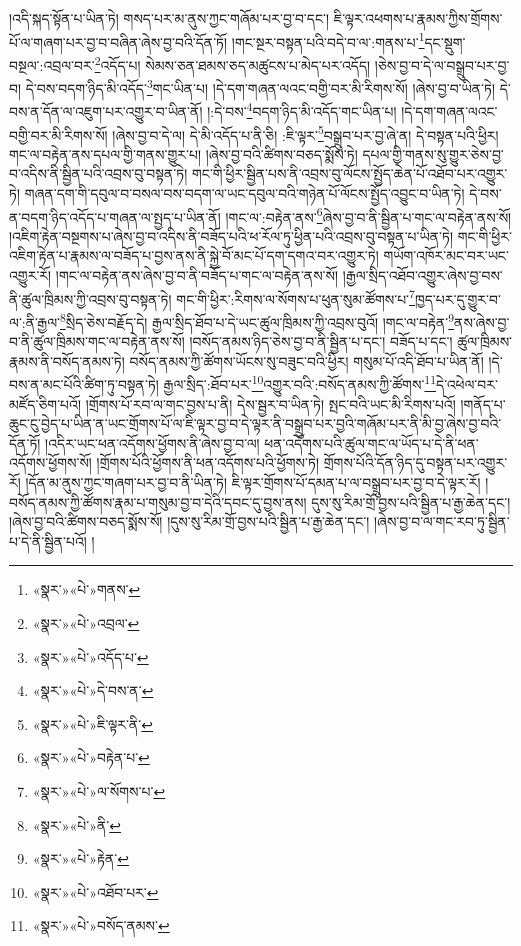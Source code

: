 །འདི་སྐད་སྟོན་པ་ཡིན་ཏེ། གསད་པར་མ་ནུས་ཀྱང་གཞོམ་པར་བྱ་བ་དང་། ཇི་ལྟར་འཕགས་པ་རྣམས་ཀྱིས་གྲོགས་པོ་ལ་གཞག་པར་བྱ་བ་བཞིན་ཞེས་བྱ་བའི་དོན་ཏོ། །གང་སྔར་བསྟན་པའི་བདེ་བ་ལ་:གནས་པ་\footnote{«སྣར་»«པེ་»གནས་}དང་སྡུག་བསྔལ་:འབྲལ་བར་\footnote{«སྣར་»«པེ་»འབྲལ་}འདོད་པ། སེམས་ཅན་ཐམས་ཅད་མཚུངས་པ་མེད་པར་འདོད། །ཅེས་བྱ་བ་དེ་ལ་བསྒྲུབ་པར་བྱ་བ། དེ་བས་བདག་ཉིད་མི་འདོད་\footnote{«སྣར་»«པེ་»འདོད་པ་}གང་ཡིན་པ། །དེ་དག་གཞན་ལའང་བགྱི་བར་མི་རིགས་སོ། །ཞེས་བྱ་བ་ཡིན་ཏེ། དེ་བས་ན་དོན་ལ་འཇུག་པར་འགྱུར་བ་ཡིན་ནོ། །:དེ་བས་\footnote{«སྣར་»«པེ་»དེ་བས་ན་}བདག་ཉིད་མི་འདོད་གང་ཡིན་པ། །དེ་དག་གཞན་ལའང་བགྱི་བར་མི་རིགས་སོ། །ཞེས་བྱ་བ་དེ་ལ། དེ་མི་འདོད་པ་ནི་ཅི། :ཇི་ལྟར་\footnote{«སྣར་»«པེ་»ཇི་ལྟར་ནི་}བསྒྲུབ་པར་བྱ་ཞེ་ན། དེ་བསྟན་པའི་ཕྱིར། གང་ལ་བརྟེན་ནས་དཔལ་གྱི་གནས་གྱུར་པ། །ཞེས་བྱ་བའི་ཚིགས་བཅད་སྨོས་ཏེ། དཔལ་གྱི་གནས་སུ་གྱུར་ཅེས་བྱ་བ་འདིས་ནི་སྦྱིན་པའི་འབྲས་བུ་བསྟན་ཏེ། གང་གི་ཕྱིར་སྦྱིན་པས་ནི་འབྲས་བུ་ལོངས་སྤྱོད་ཆེན་པོ་འཐོབ་པར་འགྱུར་ཏེ། གཞན་དག་གི་དབུལ་བ་བསལ་བས་བདག་ལ་ཡང་དབུལ་བའི་གཉེན་པོ་ལོངས་སྤྱོད་འབྱུང་བ་ཡིན་ཏེ། དེ་བས་ན་བདག་ཉིད་འདོད་པ་གཞན་ལ་སྤྱད་པ་ཡིན་ནོ། །གང་ལ་:བརྟེན་ནས་\footnote{«སྣར་»«པེ་»བརྟེན་པ་}ཞེས་བྱ་བ་ནི་སྦྱིན་པ་གང་ལ་བརྟེན་ནས་སོ། །འཇིག་རྟེན་བསྔགས་པ་ཞེས་བྱ་བ་འདིས་ནི་བཟོད་པའི་ཕ་རོལ་ཏུ་ཕྱིན་པའི་འབྲས་བུ་བསྟན་པ་ཡིན་ཏེ། གང་གི་ཕྱིར་འཇིག་རྟེན་པ་རྣམས་ལ་བཟོད་པ་བྱས་ནས་ནི་སྐྱེ་བོ་མང་པོ་དག་དགའ་བར་འགྱུར་ཏེ། གཡོག་འཁོར་མང་བར་ཡང་འགྱུར་རོ། །གང་ལ་བརྟེན་ནས་ཞེས་བྱ་བ་ནི་བཟོད་པ་གང་ལ་བརྟེན་ནས་སོ། །རྒྱལ་སྲིད་འཐོབ་འགྱུར་ཞེས་བྱ་བས་ནི་ཚུལ་ཁྲིམས་ཀྱི་འབྲས་བུ་བསྟན་ཏེ། གང་གི་ཕྱིར་:རིགས་ལ་སོགས་པ་ཕུན་སུམ་ཚོགས་པ་\footnote{«སྣར་»«པེ་»ལ་སོགས་པ་}ཁྱད་པར་དུ་གྱུར་བ་ལ་:ནི་རྒྱལ་\footnote{«སྣར་»«པེ་»ནི་}སྲིད་ཅེས་བརྗོད་དེ། རྒྱལ་སྲིད་ཐོབ་པ་དེ་ཡང་ཚུལ་ཁྲིམས་ཀྱི་འབྲས་བུའོ། །གང་ལ་བརྟེན་\footnote{«སྣར་»«པེ་»རྟེན་}ནས་ཞེས་བྱ་བ་ནི་ཚུལ་ཁྲིམས་གང་ལ་བརྟེན་ནས་སོ། །བསོད་ནམས་ཉིད་ཅེས་བྱ་བ་ནི་སྦྱིན་པ་དང་། བཟོད་པ་དང་། ཚུལ་ཁྲིམས་རྣམས་ནི་བསོད་ནམས་ཏེ། བསོད་ནམས་ཀྱི་ཚོགས་ཡོངས་སུ་བཟུང་བའི་ཕྱིར། གསུམ་པོ་འདི་ཐོབ་པ་ཡིན་ནོ། །དེ་བས་ན་མང་པོའི་ཚིག་ཏུ་བསྟན་ཏེ། རྒྱལ་སྲིད་:ཐོབ་པར་\footnote{«སྣར་»«པེ་»འཐོབ་པར་}འགྱུར་བའི་:བསོད་ནམས་ཀྱི་ཚོགས་\footnote{«སྣར་»«པེ་»བསོད་ནམས་}དེ་འཕེལ་བར་མཛོད་ཅིག་པའོ། །གྲོགས་པོ་རབ་ལ་གང་བྱས་པ་ནི། དེས་སྦྱར་བ་ཡིན་ཏེ། སྤང་བའི་ཡང་མི་རིགས་པའོ། །གནོད་པ་ཆུང་ངུ་བྱེད་པ་ཡིན་ན་ཡང་གྲོགས་པོ་ལ་ཇི་ལྟར་བྱ་བ་དེ་ལྟར་ནི་བསྒྲུབ་པར་བྱའི་གཞོམ་པར་ནི་མི་བྱ་ཞེས་བྱ་བའི་དོན་ཏོ། །འདིར་ཡང་ཕན་འདོགས་ཕྱོགས་ནི་ཞེས་བྱ་བ་ལ། ཕན་འདོགས་པའི་ཚུལ་གང་ལ་ཡོད་པ་དེ་ནི་ཕན་འདོགས་ཕྱོགས་སོ། །གྲོགས་པོའི་ཕྱོགས་ནི་ཕན་འདོགས་པའི་ཕྱོགས་ཏེ། གྲོགས་པོའི་དོན་ཉིད་དུ་བསྟན་པར་འགྱུར་རོ། །དོན་མ་ནུས་ཀྱང་གཞག་པར་བྱ་བ་ནི་ཡིན་ཏེ། ཇི་ལྟར་གྲོགས་པོ་དམན་པ་ལ་བསྒྲུབ་པར་བྱ་བ་དེ་ལྟར་རོ། །བསོད་ནམས་ཀྱི་ཚོགས་རྣམ་པ་གསུམ་བྱ་བ་དེའི་དབང་དུ་བྱས་ནས། དུས་སུ་རིམ་གྲོ་བྱས་པའི་སྦྱིན་པ་རྒྱ་ཆེན་དང་། །ཞེས་བྱ་བའི་ཚིགས་བཅད་སྨོས་སོ། །དུས་སུ་རིམ་གྲོ་བྱས་པའི་སྦྱིན་པ་རྒྱ་ཆེན་དང་། །ཞེས་བྱ་བ་ལ་གང་རབ་ཏུ་སྦྱིན་པ་དེ་ནི་སྦྱིན་པའོ། །
